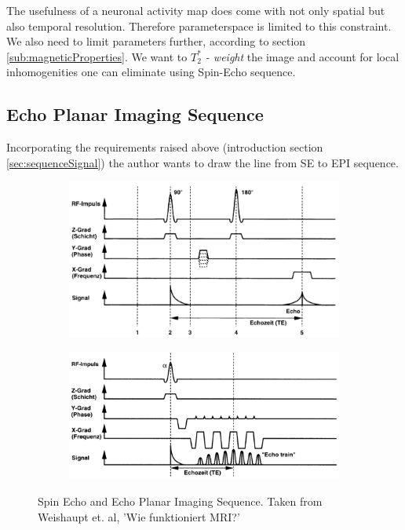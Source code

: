 \documentclass[a4paper]{scrartcl}
\begin{document}
The usefulness of a neuronal activity map does come with not only spatial but also temporal resolution.
Therefore parameterspace is limited to this constraint.
We also need to limit parameters further, according to section \ref{sub:magneticProperties}. 
We want to \textit{$T_2^*$ - weight} the image and account for local inhomogenities one can eliminate using Spin-Echo sequence.

\subsection{Echo Planar Imaging Sequence}
\label{sub:epi}

Incorporating the requirements raised above (introduction section \ref{sec:sequenceSignal}) the author wants to draw the line from SE to EPI sequence.
\begin{figure}[hbt]
  \centering
  \begin{subfigure}[l]{0.45\textwidth}
    \includegraphics[width = .9\textwidth]{pictures/seSeq.png}
  \end{subfigure}
  \centering
  \begin{subfigure}[r]{0.45\textwidth}
    \includegraphics[width = .9\textwidth]{pictures/episeq.png}
    \end{subfigure}
  \caption{Spin Echo and Echo Planar Imaging Sequence. Taken from Weishaupt et. al, 'Wie funktioniert MRI?'\cite{weishaupt}}
\end{figure}
\end{document}

